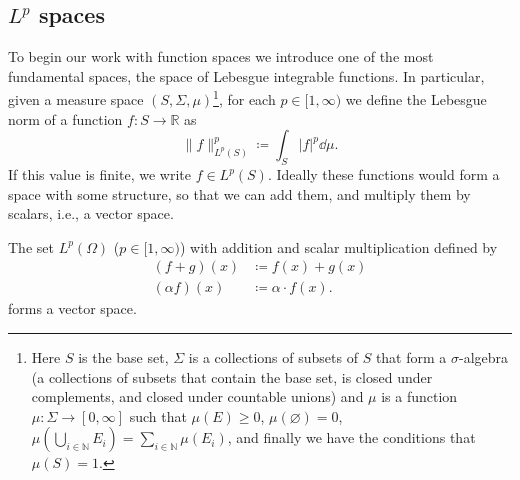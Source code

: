 \subsection{\texorpdfstring{\(L^p\)}{Lp} spaces}\label{subsec:lp}
To begin our work with function spaces we introduce one of the most fundamental
spaces, the space of Lebesgue integrable functions. In particular, given a
measure space \((S,\Sigma, \mu)\)\footnote{Here \(S\) is the base set,
    \(\Sigma\) is a collections of subsets of \(S\) that form a \(\sigma\)-algebra
    (a collections of subsets that contain the base set, is closed under
    complements, and closed under countable unions) and \(\mu\) is a function
    \(\mu:\Sigma\to[0,\infty]\) such that \(\mu(E)\geq 0\),
    \(\mu(\varnothing) = 0\), \(\mu\left(\bigcup_{i\in\mathbb{N}}E_i\right) = \sum_{i\in\mathbb{N}}\mu(E_i)\),
    and finally we have the conditions that \(\mu(S) = 1\).}, for each
\(p\in[1,\infty)\) we define the Lebesgue norm of a function %
\(f:S\to\mathbb{R}\) as
\begin{equation}
    \|f\|_{L^p(S)}^p\coloneqq \int_S|f|^p\dd{\mu}.
\end{equation}
If this value is finite, we write \(f\in L^p(S)\). Ideally these functions would
form a space with some structure, so that we can add them, and multiply them by
scalars, i.e., a vector space.
\begin{lemma}
    The set \(L^p(\Omega)\) (\(p\in[1,\infty)\)) with addition and scalar %
    multiplication defined by
    \begin{align}
        (f + g)(x)    & \coloneqq f(x) + g(x)       \\
        (\alpha f)(x) & \coloneqq \alpha\cdot f(x).
    \end{align}
    forms a vector space.
\end{lemma}
